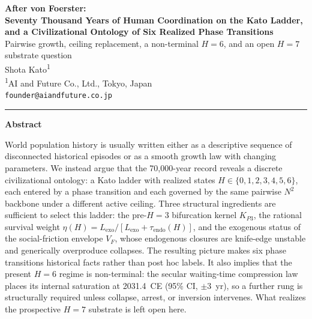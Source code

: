 \documentclass[11pt]{article}
\date{}
\author{}
\title{}
\begin{document}
\linenumbers
\pagestyle{plain}

\begin{center}
{\LARGE\bfseries After von Foerster:}\\[4pt]
{\LARGE\bfseries Seventy Thousand Years of Human Coordination on the Kato Ladder,}\\[3pt]
{\LARGE\bfseries and a Civilizational Ontology of Six Realized Phase Transitions}\\[8pt]
{\color{gray}\normalsize Pairwise growth, ceiling replacement, a non-terminal \(H{=}6\), and an open \(H{=}7\) substrate question}\\[6pt]
{\small Shota Kato\textsuperscript{1}}\\[1pt]
{\footnotesize\textsuperscript{1}AI and Future Co., Ltd., Tokyo, Japan}\\[1pt]
{\footnotesize\texttt{founder@aiandfuture.co.jp}}
\end{center}
\vspace{3pt}
\noindent\rule{\textwidth}{0.4pt}
\vspace{1pt}

\begin{center}
{\normalsize\bfseries Abstract}
\end{center}
\vspace{-4pt}
{\small\noindent
World population history is usually written either as a descriptive sequence of disconnected historical episodes or as a smooth growth law with changing parameters.
We instead argue that the 70,000-year record reveals a discrete civilizational ontology: a Kato ladder with realized states \(H\in\{0,1,2,3,4,5,6\}\), each entered by a phase transition and each governed by the same pairwise \(N^2\) backbone under a different active ceiling.
Three structural ingredients are sufficient to select this ladder: the pre-\(H{=}3\) bifurcation kernel \(K_{P3}\), the rational survival weight \(\eta(H)=L_{\mathrm{exo}}/[L_{\mathrm{exo}}+\tau_{\mathrm{endo}}(H)]\), and the exogenous status of the social-friction envelope \(V_F\), whose endogenous closures are knife-edge unstable and generically overproduce collapses.
The resulting picture makes six phase transitions historical facts rather than post hoc labels.
It also implies that the present \(H{=}6\) regime is non-terminal: the secular waiting-time compression law places its internal saturation at 2031.4~CE (95\% CI, \(\pm 3\)~yr), so a further rung is structurally required unless collapse, arrest, or inversion intervenes.
What realizes the prospective \(H{=}7\) substrate is left open here.
}
\end{document}
